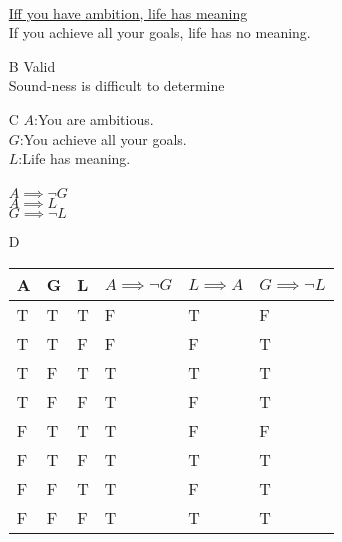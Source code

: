 \documentclass{article}
\begin{document}
\begin{enumerate}
		\\\underline{Iff you have ambition, life has meaning}
		\\If you achieve all your goals, life has no meaning.
	\item[B]
		Valid
		\\Sound-ness is difficult to determine
	\item[C]
		$A$:You are ambitious.\\
		$G$:You achieve all your goals.\\
		$L$:Life has meaning.\\
		\\
		$A \implies \lnot G$\\
		\underline{$A \implies L$}\\
		$G \implies \lnot L$
	\item[D]
		\begin{tabular}{l | l | l || l | l || l}
			A & G & L & $A \implies \lnot G$ & $L \implies A$ & $G \implies \lnot L$\\ \hline
			T & T & T & F & T & F\\
			T & T & F & F & F & T\\
			T & F & T & T & T & T\\
			T & F & F & T & F & T\\
			F & T & T & T & F & F\\
			F & T & F & T & T & T\\
			F & F & T & T & F & T\\
			F & F & F & T & T & T\\
		\end{tabular}
		\\\\


\end{enumerate}
\end{document}
